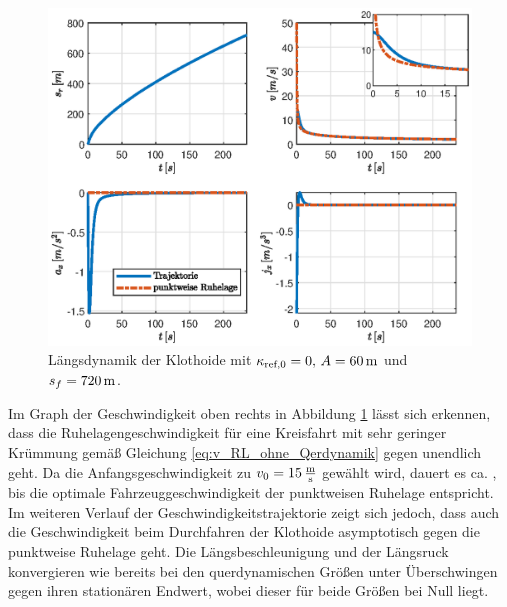 \begin{figure}[h] 
	\centering
	\includegraphics[width=\linewidth]{./Bilder/Ergebnisse/Klothoide/Ohne_umax/svaj.eps}
	\caption{Längsdynamik der Klothoide mit $\kappa_{\textrm{ref},0} = 0,\, A = 60\,\mathrm{m}$ und $s_f = 720\,\mathrm{m}$.}
	\label{fig:svaj_klothoide}
\end{figure} 
Im Graph der Geschwindigkeit oben rechts in Abbildung \ref{fig:svaj_klothoide} lässt sich erkennen, dass die Ruhelagengeschwindigkeit für eine Kreisfahrt mit sehr geringer Krümmung gemäß Gleichung \eqref{eq:v_RL_ohne_Qerdynamik} gegen unendlich geht. Da die Anfangsgeschwindigkeit zu $v_0 = 15\,\mathrm{\frac{\mathrm{m}}{\mathrm{s}}}$ gewählt wird, dauert es ca. , bis die optimale Fahrzeuggeschwindigkeit der punktweisen Ruhelage entspricht. Im weiteren Verlauf der Geschwindigkeitstrajektorie zeigt sich jedoch, dass auch die Geschwindigkeit beim Durchfahren der Klothoide asymptotisch gegen die punktweise Ruhelage geht. Die Längsbeschleunigung und der Längsruck konvergieren wie bereits bei den querdynamischen Größen unter Überschwingen gegen ihren stationären Endwert, wobei dieser für beide Größen bei Null liegt.


